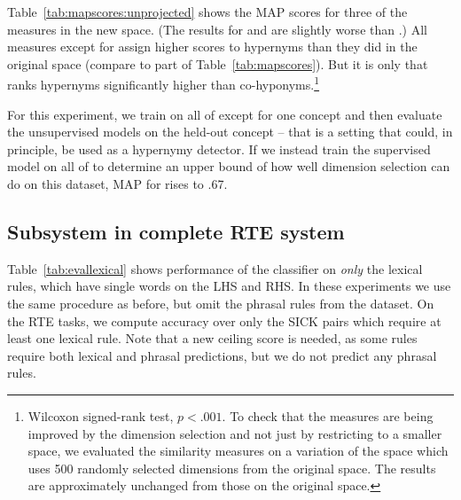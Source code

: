 \documentclass[letterpaper]{article}
\begin{document}
Table~\ref{tab:mapscores:unprojected} shows the MAP scores for three
of the 
measures in the new {\UpWWu} space. (The results for {\balAPinc} and
{\WeedsPrec} are slightly worse than {\ClarkeDE}.)
All measures except for {\cosine}
assign higher scores to hypernyms than they did in the original space
(compare to {\UpWW} part of Table~\ref{tab:mapscores}).
But it is only {\invCL} that ranks hypernyms significantly higher 
than co-hyponyms.\footnote{Wilcoxon signed-rank test, $p < .001$. 
To check that the measures are being improved by the dimension selection and not just by restricting to a smaller space,
we evaluated the similarity measures on a variation
of the {\UpWW} space which uses 500 randomly selected dimensions from the
original space.  The results are approximately unchanged from those on the original
{\UpWW} space.
}

For this experiment, we train on all of {\bless}
except for one concept and then evaluate the unsupervised models on
the held-out concept -- that is a setting that could, in principle, be
used as a hypernymy detector. If we instead train the supervised model
on all of {\bless} to determine an upper bound of how well dimension
selection can do on this dataset, MAP for {\invCL} rises to .67.



\subsection{Subsystem in complete RTE system}

Table~\ref{tab:evallexical} shows performance of the classifier on {\em only}
the lexical rules, which have single words on the LHS and RHS. In these
experiments we use the same procedure as before, but omit the phrasal rules
from the dataset. On the RTE tasks, we compute accuracy over only the SICK
pairs which require at least one lexical rule. Note that a new ceiling
score is needed, as some rules require both lexical and phrasal
predictions, but we do not predict any phrasal rules.
\end{document}
